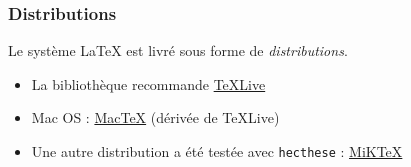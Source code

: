 
\begin{frame}[c]

	\frametitle{Distributions}
	
	Le système {\LaTeX} est livré sous forme de \emph{distributions}.
	
	\begin{itemize}
		\item La bibliothèque recommande \href{https://www.tug.org/texlive}{\TeX Live}
		\item Mac OS : \href{https://www.tug.org/mactex}{Mac\TeX} (dérivée de \TeX Live)
		\item Une autre distribution a été testée avec \texttt{hecthese} :
			\href{https://miktex.org/download}{MiK\TeX}
	\end{itemize}
\end{frame}
